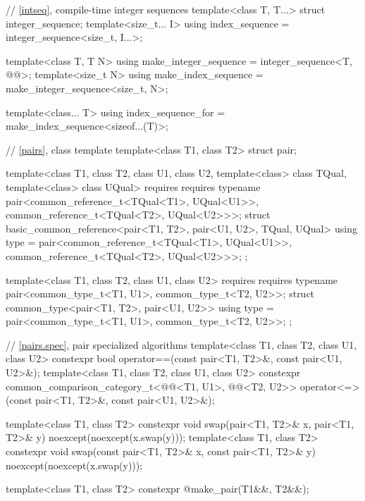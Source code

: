 \begin{codeblock}
{  // \ref{intseq}, compile-time integer sequences%
%
%
  template<class T, T...>
    struct integer_sequence;
  template<size_t... I>
    using index_sequence = integer_sequence<size_t, I...>;

  template<class T, T N>
    using make_integer_sequence = integer_sequence<T, @\seebelow{}@>;
  template<size_t N>
    using make_index_sequence = make_integer_sequence<size_t, N>;

  template<class... T>
    using index_sequence_for = make_index_sequence<sizeof...(T)>;

  // \ref{pairs}, class template 
  template<class T1, class T2>
    struct pair;

  template<class T1, class T2, class U1, class U2,
           template<class> class TQual, template<class> class UQual>
    requires requires { typename pair<common_reference_t<TQual<T1>, UQual<U1>>,
                                      common_reference_t<TQual<T2>, UQual<U2>>>; }
  struct basic_common_reference<pair<T1, T2>, pair<U1, U2>, TQual, UQual> {
    using type = pair<common_reference_t<TQual<T1>, UQual<U1>>,
                      common_reference_t<TQual<T2>, UQual<U2>>>;
  };

  template<class T1, class T2, class U1, class U2>
    requires requires { typename pair<common_type_t<T1, U1>, common_type_t<T2, U2>>; }
  struct common_type<pair<T1, T2>, pair<U1, U2>> {
    using type = pair<common_type_t<T1, U1>, common_type_t<T2, U2>>;
  };

  // \ref{pairs.spec}, pair specialized algorithms
  template<class T1, class T2, class U1, class U2>
    constexpr bool operator==(const pair<T1, T2>&, const pair<U1, U2>&);
  template<class T1, class T2, class U1, class U2>
    constexpr common_comparison_category_t<@@<T1, U1>,
                                           @@<T2, U2>>
      operator<=>(const pair<T1, T2>&, const pair<U1, U2>&);

  template<class T1, class T2>
    constexpr void swap(pair<T1, T2>& x, pair<T1, T2>& y) noexcept(noexcept(x.swap(y)));
  template<class T1, class T2>
    constexpr void swap(const pair<T1, T2>& x, const pair<T1, T2>& y)
      noexcept(noexcept(x.swap(y)));

  template<class T1, class T2>
    constexpr @\seebelow@ make_pair(T1&&, T2&&);

}
\end{codeblock}
